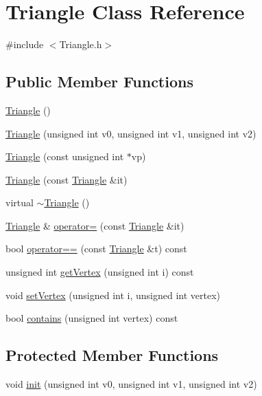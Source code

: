 \hypertarget{class_triangle}{
\section{Triangle Class Reference}
\label{class_triangle}
}


{\ttfamily \#include $<$Triangle.h$>$}

\subsection*{Public Member Functions}
\begin{DoxyCompactItemize}
\item 
\hyperlink{class_triangle_aaefe4ed500c07918d30c6f0e286332c5}{Triangle} ()
\item 
\hyperlink{class_triangle_ac855aa7c9164458725b26d358c51540a}{Triangle} (unsigned int v0, unsigned int v1, unsigned int v2)
\item 
\hyperlink{class_triangle_abaf08403a27a26dbc47a5d70c5bb00eb}{Triangle} (const unsigned int $\ast$vp)
\item 
\hyperlink{class_triangle_a66d993754ef093c2c1319a733eee0523}{Triangle} (const \hyperlink{class_triangle}{Triangle} \&it)
\item 
virtual \hyperlink{class_triangle_a81dbbf1be60e083d3d92be4d0291b3b5}{$\sim$Triangle} ()
\item 
\hyperlink{class_triangle}{Triangle} \& \hyperlink{class_triangle_a0397ff9605ee5119c97d491f2c26555f}{operator=} (const \hyperlink{class_triangle}{Triangle} \&it)
\item 
bool \hyperlink{class_triangle_a8a28087139b044277e66bcf61d95f067}{operator==} (const \hyperlink{class_triangle}{Triangle} \&t) const 
\item 
unsigned int \hyperlink{class_triangle_a82674aa7f7a2b316848f0a6743e29921}{getVertex} (unsigned int i) const 
\item 
void \hyperlink{class_triangle_a5b2a044f6079b68a9d840f8ffeffd4e1}{setVertex} (unsigned int i, unsigned int vertex)
\item 
bool \hyperlink{class_triangle_a04e94a20f7e63d33495d163f5a059e9b}{contains} (unsigned int vertex) const 
\end{DoxyCompactItemize}
\subsection*{Protected Member Functions}
\begin{DoxyCompactItemize}
\item 
void \hyperlink{class_triangle_a2f86c57f50a7d9f0678485ba38a8063c}{init} (unsigned int v0, unsigned int v1, unsigned int v2)
\end{DoxyCompactItemize}


